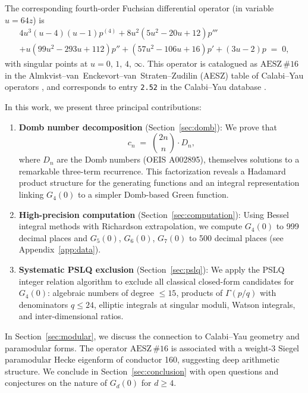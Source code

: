 \documentclass[12pt,a4paper]{article}
\numberwithin{equation}{section}
\theoremstyle{plain}
\theoremstyle{definition}
\theoremstyle{remark}
\newcommand{\aesz}[1]{\mathrm{AESZ}\,\#\!{#1}}
\begin{document}
The corresponding fourth-order Fuchsian differential operator (in variable $u = 64z$) is
\begin{multline}\label{eq:fuchsian-ode}
  4u^3(u-4)(u-1) p^{(4)} + 8u^2(5u^2 - 20u + 12) p''' \\
  + u(99u^2 - 293u + 112) p'' + (57u^2 - 106u + 16) p' + (3u - 2) p \;=\; 0,
\end{multline}
with singular points at $u = 0,\,1,\,4,\,\infty$. This operator is catalogued as
$\aesz{16}$ in the Almkvist--van~Enckevort--van~Straten--Zudilin (AESZ) table of Calabi--Yau operators
\cite{AESZ2005,AESZ2011}, and corresponds to entry \texttt{2.52} in the Calabi--Yau database \cite{CYDB}.

In this work, we present three principal contributions:
\begin{enumerate}[leftmargin=*,itemsep=3pt]
  \item \textbf{Domb number decomposition} (Section~\ref{sec:domb}): We prove that
    \[
      c_n \;=\; \binom{2n}{n} \cdot D_n,
    \]
    where $D_n$ are the Domb numbers (OEIS A002895), themselves solutions to a remarkable three-term recurrence.
    This factorization reveals a Hadamard product structure for the generating functions and an integral
    representation linking $G_4(0)$ to a simpler Domb-based Green function.

  \item \textbf{High-precision computation} (Section~\ref{sec:computation}): Using Bessel integral methods
    with Richardson extrapolation, we compute $G_4(0)$ to 999 decimal places and $G_5(0)$, $G_6(0)$, $G_7(0)$
    to 500 decimal places (see Appendix~\ref{app:data}).

  \item \textbf{Systematic PSLQ exclusion} (Section~\ref{sec:pslq}): We apply the PSLQ integer relation
    algorithm \cite{Ferguson1999} to exclude all classical closed-form candidates for $G_4(0)$:
    algebraic numbers of degree $\leq 15$, products of $\Gamma(p/q)$ with denominators $q \leq 24$,
    elliptic integrals at singular moduli, Watson integrals, and inter-dimensional ratios.
\end{enumerate}

In Section~\ref{sec:modular}, we discuss the connection to Calabi--Yau geometry and paramodular forms.
The operator $\aesz{16}$ is associated with a weight-3 Siegel paramodular Hecke eigenform of conductor 160,
suggesting deep arithmetic structure. We conclude in Section~\ref{sec:conclusion} with open questions
and conjectures on the nature of $G_d(0)$ for $d \geq 4$.
\end{document}
